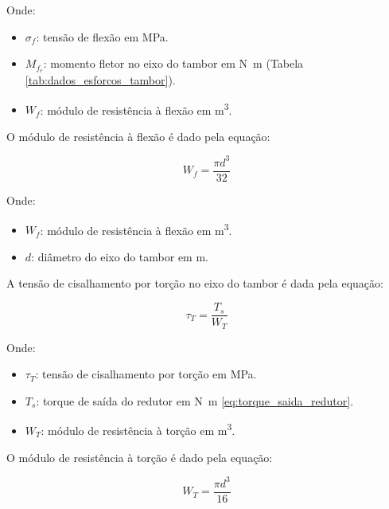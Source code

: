 Onde:

\begin{itemize}
  \item $\sigma_f$: tensão de flexão em \si{\mega\pascal}.
  \item $M_{f_e}$: momento fletor no eixo do tambor em \si{\newton\meter} (Tabela \ref{tab:dados_esforcos_tambor}).
  \item $W_f$: módulo de resistência à flexão em \si{\meter^3}.
\end{itemize}

\vspace{1em}

O módulo de resistência à flexão é dado pela equação:

\begin{equation}
  W_f = \frac{\pi d^3}{32}
  \label{eq:modulo_de_resistencia_a_flexao_eixo_do_tambor}
\end{equation}

Onde:

\begin{itemize}
  \item $W_f$: módulo de resistência à flexão em \si{\meter^3}.
  \item $d$: diâmetro do eixo do tambor em \si{\meter}.
\end{itemize}

\vspace{1em}

A tensão de cisalhamento por torção no eixo do tambor é dada pela equação:

\begin{equation}
  \tau_T = \frac{T_s}{W_T}
  \label{eq:tensao_cisalhamento_por_torcao_eixo_do_tambor}
\end{equation}

Onde:

\begin{itemize}
  \item $\tau_T$: tensão de cisalhamento por torção em \si{\mega\pascal}.
  \item $T_s$: torque de saída do redutor em \si{\newton\meter} \eqref{eq:torque_saida_redutor}.
  \item $W_T$: módulo de resistência à torção em \si{\meter^3}.
\end{itemize}

\vspace{1em}

O módulo de resistência à torção é dado pela equação:

\begin{equation}
  W_T = \frac{\pi d^3}{16}
  \label{eq:modulo_de_resistencia_a_torcao_eixo_do_tambor}
\end{equation}

